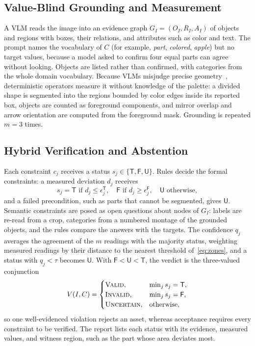 \documentclass[conference]{IEEEtran}
\newcommand{\Valid}{\textsc{Valid}}
\newcommand{\Invalid}{\textsc{Invalid}}
\newcommand{\Uncertain}{\textsc{Uncertain}}
\newcommand{\sT}{\mathsf{T}}
\newcommand{\sF}{\mathsf{F}}
\newcommand{\sU}{\mathsf{U}}
\begin{document}
\subsection{Value-Blind Grounding and Measurement}\label{sec:grounding}
A VLM reads the image into an evidence graph $G_I=(O_I,R_I,A_I)$ of objects and regions with boxes, their relations, and attributes such as color and text. The prompt names the vocabulary of $C$ (for example, \emph{part}, \emph{colored}, \emph{apple}) but no target values, because a model asked to confirm four equal parts can agree without looking. Objects are listed rather than confirmed, with categories from the whole domain vocabulary. Because VLMs misjudge precise geometry~\cite{rahmanzadehgervi2024blind}, deterministic operators measure it without knowledge of the palette: a divided shape is segmented into the regions bounded by color edges inside its reported box, objects are counted as foreground components, and mirror overlap and arrow orientation are computed from the foreground mask. Grounding is repeated $m=3$ times.

\subsection{Hybrid Verification and Abstention}\label{sec:verify}
Each constraint $c_j$ receives a status $s_j\in\{\sT,\sF,\sU\}$. Rules decide the formal constraints: a measured deviation $d_j$ receives
\begin{equation}
s_j=\sT \text{ if } d_j\le\epsilon_j^{\sT},\quad \sF \text{ if } d_j\ge\epsilon_j^{\sF},\quad \sU \text{ otherwise},\label{eq:zones}
\end{equation}
and a failed precondition, such as parts that cannot be segmented, gives $\sU$. Semantic constraints are posed as open questions about nodes of $G_I$: labels are re-read from a crop, categories from a numbered montage of the grounded objects, and the rules compare the answers with the targets. The confidence $q_j$ averages the agreement of the $m$ readings with the majority status, weighting measured readings by their distance to the nearest threshold of~\eqref{eq:zones}, and a status with $q_j<\tau$ becomes $\sU$. With $\sF<\sU<\sT$, the verdict is the three-valued conjunction
\begin{equation}
V(I,C)=\begin{cases}\Valid, & \min_j s_j=\sT,\\ \Invalid, & \min_j s_j=\sF,\\ \Uncertain, & \text{otherwise},\end{cases}\label{eq:verdict}
\end{equation}
so one well-evidenced violation rejects an asset, whereas acceptance requires every constraint to be verified. The report lists each status with its evidence, measured values, and witness region, such as the part whose area deviates most.
\end{document}
